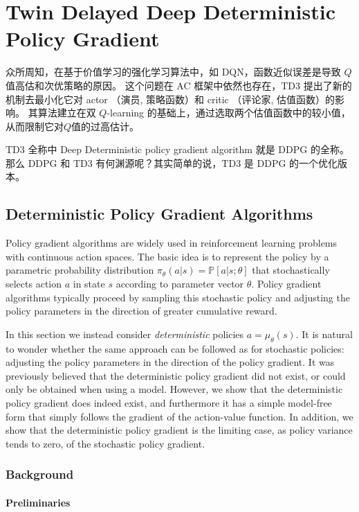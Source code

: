 ﻿
\chapter{Twin Delayed Deep Deterministic Policy Gradient}

众所周知，在基于价值学习的强化学习算法中，如 DQN，函数近似误差是导致 $Q$ 值高估和次优策略的原因。
这个问题在 AC 框架中依然也存在，TD3 
提出了新的机制去最小化它对 actor （演员, 策略函数）和 critic （评论家, 估值函数）的影响。
其算法建立在双 $Q$-learning 的基础上，通过选取两个估值函数中的较小值，从而限制它对$Q$值的过高估计。

TD3 全称中 Deep Deterministic policy gradient algorithm 就是 DDPG 的全称。那么 
DDPG 和 TD3 有何渊源呢？其实简单的说，TD3 是 DDPG 的一个优化版本。


\section{Deterministic Policy Gradient Algorithms}

Policy gradient algorithms are widely used in reinforcement learning problems 
with continuous action spaces. The basic idea is to represent the policy by 
a parametric probability distribution $\pi_\theta(a|s) = \mathbb{P}
[a|s; \theta]$ that stochastically selects action $a$ in state $s$ according 
to parameter vector $\theta$. Policy gradient algorithms typically proceed 
by sampling this stochastic policy and adjusting the policy parameters
in the direction of greater cumulative reward.

In this section we instead consider \emph{deterministic} policies 
$a = \mu_\theta(s)$. It is natural to wonder whether the same approach can 
be followed as for stochastic policies: adjusting the policy parameters in 
the direction of the policy gradient. It was previously believed that the 
deterministic policy gradient did not exist, or could only be obtained when
using a model. However, we show that the deterministic policy gradient does 
indeed exist, and furthermore it has a simple model-free form that simply 
follows the gradient of the action-value function. In addition, we 
show that the deterministic policy gradient is the limiting
case, as policy variance tends to zero, of the stochastic policy gradient.

\subsection{Background}

\subsubsection{Preliminaries}

